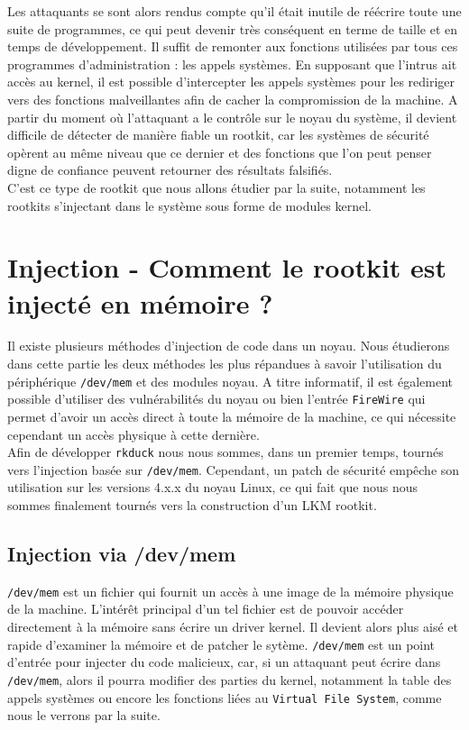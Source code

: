 \documentclass[11pt]{article}
\begin{document}
	Les attaquants se sont alors rendus compte qu'il était inutile de réécrire toute une suite de programmes, ce qui peut devenir très conséquent en terme de taille et en temps de développement. Il suffit de remonter aux fonctions utilisées par tous ces programmes d'administration : les appels systèmes. En supposant que l'intrus ait accès au kernel, il est possible d'intercepter les appels systèmes pour les rediriger vers des fonctions malveillantes afin de cacher la compromission de la machine. A partir du moment où l'attaquant a le contrôle sur le noyau du système, il devient difficile de détecter de manière fiable un rootkit, car les systèmes de sécurité opèrent au même niveau que ce dernier et des fonctions que l'on peut penser digne de confiance peuvent retourner des résultats falsifiés. \\
	C'est ce type de rootkit que nous allons étudier par la suite, notamment les rootkits s'injectant dans le système sous forme de modules kernel.



\section{Injection - Comment le rootkit est injecté en mémoire ?}

	Il existe plusieurs méthodes d'injection de code dans un noyau. Nous étudierons dans cette partie les deux méthodes les plus répandues à savoir l'utilisation du périphérique \texttt{/dev/mem} et des modules noyau. A titre informatif, il est également possible d'utiliser des vulnérabilités du noyau ou bien l'entrée \texttt{FireWire} qui permet d'avoir un accès direct à toute la mémoire de la machine, ce qui nécessite cependant un accès physique à cette dernière.\\

	Afin de développer \texttt{rkduck} nous nous sommes, dans un premier temps, tournés vers l'injection basée sur \texttt{/dev/mem}. Cependant, un patch de sécurité empêche son utilisation sur les versions 4.x.x du noyau Linux, ce qui fait que nous nous sommes finalement tournés vers la construction d'un LKM rootkit.

	\subsection{Injection via /dev/mem}
	
		\texttt{/dev/mem} est un fichier qui fournit un accès à une image de la mémoire physique de la machine. L'intérêt principal d'un tel fichier est de pouvoir accéder directement à la mémoire sans écrire un driver kernel. Il devient alors plus aisé et rapide d'examiner la mémoire et de patcher le sytème. \texttt{/dev/mem} est un point d'entrée pour injecter du code malicieux, car, si un attaquant peut écrire dans \texttt{/dev/mem}, alors il pourra modifier des parties du kernel, notamment la table des appels systèmes ou encore les fonctions liées au \texttt{Virtual File System}, comme nous le verrons par la suite.\\
		
\end{document}
